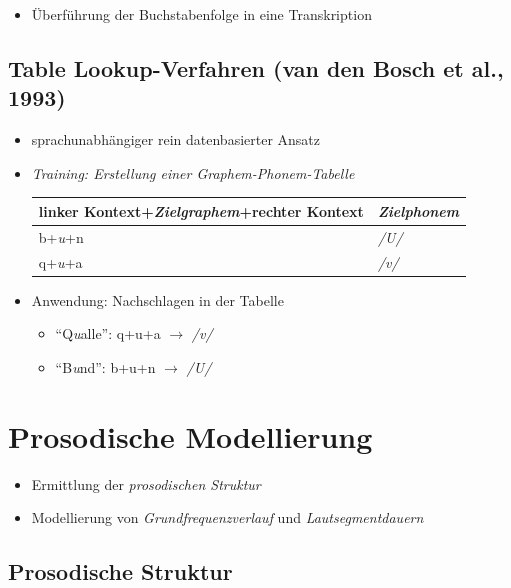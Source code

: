 \documentclass[11pt]{book}
\begin{document}
  \begin{itemize}
  \item Überführung der Buchstabenfolge in eine Transkription
  \end{itemize}

  \subsection*{Table Lookup-Verfahren (van den Bosch et al., 1993)}

  \begin{itemize}
  \item sprachunabhängiger rein datenbasierter Ansatz
  \item \emph{Training: Erstellung einer Graphem-Phonem-Tabelle}

  \begin{tabular}{|l|l|}
  \hline
  linker Kontext+\emph{Zielgraphem}+rechter Kontext & \emph{Zielphonem}\\
  \hline
  b+\emph{u}+n & \emph{/U/} \\
  q+\emph{u}+a & \emph{/v/} \\
  \hline
  \end{tabular}

  \item Anwendung: Nachschlagen in der Tabelle
  \begin{itemize}
  \item ``Q\emph{u}alle'':  q+u+a $\longrightarrow$ \emph{/v/}
  \item ``B\emph{u}nd'': b+u+n $\longrightarrow$ \emph{/U/}
  \end{itemize}
  \end{itemize}

  \section{Prosodische Modellierung}

  \begin{itemize}
  \item Ermittlung der \emph{prosodischen Struktur}
  \item Modellierung von \emph{Grundfrequenzverlauf} und \emph{Lautsegmentdauern}
  \end{itemize}

  \subsection*{Prosodische Struktur}
\end{document}
